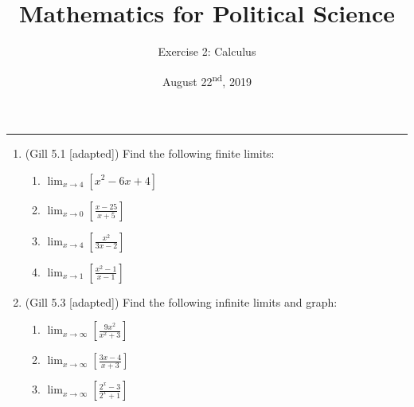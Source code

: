\documentclass[11pt]{article}
\title{\Large{\bf{\vspace{-100pt}Mathematics for Political Science \vspace{-15pt}}}}
\author{\large{Exercise 2: Calculus}}
\date{August 22\textsuperscript{nd}, 2019}
\begin{document}
\maketitle

\hrule

\vspace{.5cm}

\begin{enumerate}


\item (Gill 5.1 [adapted]) Find the following finite limits:
\begin{enumerate}
\item $\displaystyle\lim_{x\rightarrow 4} [x^2 - 6x + 4]$ %
\item $\displaystyle\lim_{x\rightarrow 0} [\frac{x-25}{x+5}]$ %
\item $\displaystyle\lim_{x\rightarrow 4} [\frac{x^2}{3x-2}]$ %
\item $\displaystyle\lim_{x\rightarrow 1} [\frac{x^2 - 1}{x-1}]$ %
\end{enumerate}

\vspace{.5cm}

\item (Gill 5.3 [adapted]) Find the following infinite limits and graph:
\begin{enumerate}
\item $\displaystyle\lim_{x\rightarrow \infty} [\frac{9x^2}{x^2 + 3}]$ %
\item $\displaystyle\lim_{x\rightarrow \infty} [\frac{3x-4}{x+3}]$ %
\item $\displaystyle\lim_{x\rightarrow \infty} [\frac{2^x - 3}{2^x + 1}]$ %
\end{enumerate}

\vspace{.5cm}


\end{enumerate}
\end{document}
